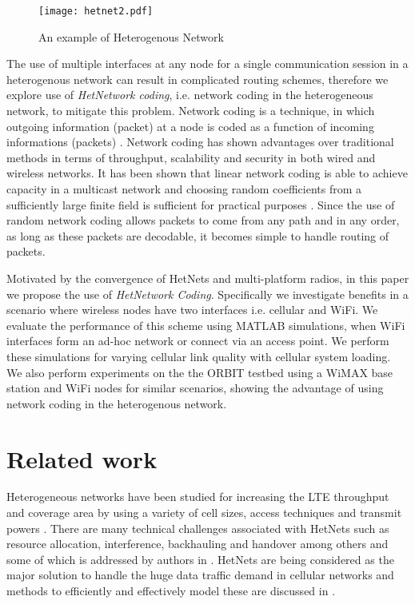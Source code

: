 \documentclass{sig-alternate-10pt}
\begin{document}
\begin{figure}[t]
\begin{center}
\texttt{[image: hetnet2.pdf]}
\end{center}
\caption{An example of Heterogenous Network}
\label{fig:hetnet}
\end{figure}

The use of multiple interfaces at any node for a single communication session in a heterogenous network can result in complicated routing schemes, therefore we explore use of \emph{HetNetwork coding}, i.e. network coding in the heterogeneous network,  to mitigate this problem. Network coding is a technique, in which outgoing information (packet) at a node is coded as a function of incoming informations (packets) \cite{Ahlswede00networkinformation}. Network coding has shown advantages over traditional methods in terms of throughput, scalability and security in both wired and wireless networks. It has been shown that linear network coding is able to achieve capacity in a multicast network and choosing random coefficients from a sufficiently large finite field is sufficient for practical purposes \cite{Ho06arandom,Ho03onrandomized}. Since the use of random network coding allows packets to come from any path and in any order, as long as these packets are decodable, it becomes simple to handle routing of packets.

Motivated by the convergence of HetNets and multi-platform radios, in this paper we propose the use of {\em HetNetwork Coding}. Specifically we investigate benefits in a  scenario where wireless nodes have two interfaces i.e. cellular and WiFi. We evaluate the performance of this scheme using MATLAB simulations, when WiFi interfaces form an ad-hoc network or connect via an access point. We perform these simulations for varying cellular link quality  with cellular system loading. We also perform experiments  on the the ORBIT testbed \cite{Raychaudhuri05orbit} using a WiMAX base station and WiFi nodes for similar scenarios, showing the advantage of using network coding in the heterogenous network.

\section{Related work}
Heterogeneous networks have been studied for increasing the LTE throughput and coverage area by using a variety of cell sizes, access techniques and transmit powers \cite{Damn11surveyhetnet}\cite{ping11hetnet}. There are many technical challenges associated with HetNets such as resource allocation, interference, backhauling and handover among others and some of which is addressed by authors in \cite{lopez11hetnetinterference,haoming11fiberhetnet}. HetNets are being considered as the major solution to handle the huge data traffic demand in cellular networks and  methods to efficiently and effectively model these are discussed in  \cite{andrews13hetnets}.
\end{document}
